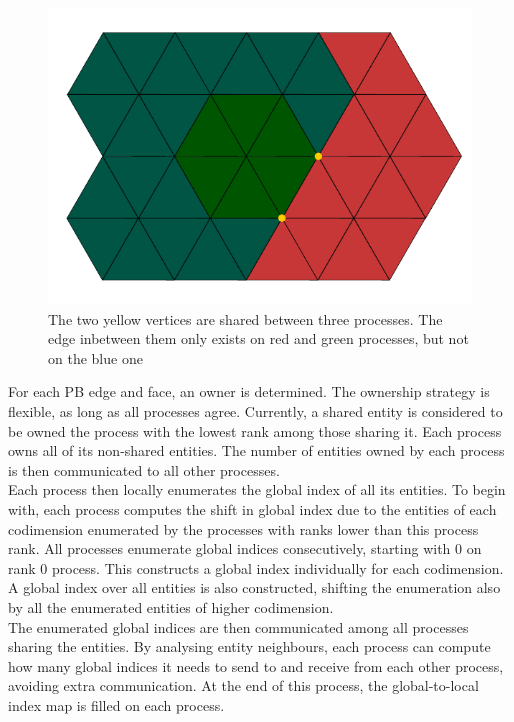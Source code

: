 \begin{figure}
    \centering
	\includegraphics[scale=0.5]{images/parallel-fake-edge}
	\caption{The two yellow vertices are shared between three processes. The edge inbetween them only exists on red and green processes, but not on the blue one}
	\label{fig:impl:globalindex:fakeedge}
\end{figure}

\noindent
For each PB edge and face, an owner is determined. The ownership strategy is flexible, as long as all processes agree. Currently, a shared entity is considered to be owned the process with the lowest rank among those sharing it. Each process owns all of its non-shared entities. The number of entities owned by each process is then communicated to all other processes. \\

\noindent
Each process then locally enumerates the global index of all its entities. To begin with, each process computes the shift in global index due to the entities of each codimension enumerated by the processes with ranks lower than this process rank. All processes enumerate global indices consecutively, starting with 0 on rank 0 process. This constructs a global index individually for each codimension. A global index over all entities is also constructed, shifting the enumeration also by all the enumerated entities of higher codimension. \\

\noindent
The enumerated global indices are then communicated among all processes sharing the entities. By analysing entity neighbours, each process can compute how many global indices it needs to send to and receive from each other process, avoiding extra communication. At the end of this process, the global-to-local index map is filled on each process.



